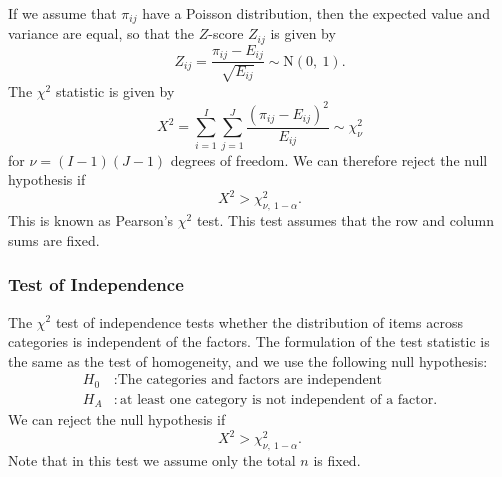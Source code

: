 \documentclass{article}
\begin{document}
If we assume that \(\pi_{ij}\) have a Poisson distribution, then the expected value and variance are equal, so that
the \(Z\)-score \(Z_{ij}\) is given by
\begin{equation*}
    Z_{ij} = \frac{\pi_{ij} - E_{ij}}{\sqrt{E_{ij}}} \sim \mathrm{N}\left( 0,\: 1 \right).
\end{equation*}
The \(\chi^2\) statistic is given by
\begin{equation*}
    X^2 = \sum_{i = 1}^I \sum_{j = 1}^J \frac{\left( \pi_{ij} - E_{ij} \right)^2}{E_{ij}} \sim \chi_{\nu}^2
\end{equation*}
for \(\nu = \left( I - 1 \right)\left( J - 1 \right)\) degrees of freedom. We can therefore reject the null hypothesis if
\begin{equation*}
    X^2 > \chi_{\nu, \: 1 - \alpha}^2.
\end{equation*}
This is known as Pearson's \(\chi^2\) test. This test assumes that the row and column sums are fixed.
\subsubsection{Test of Independence}
The \(\chi^2\) test of independence tests whether the distribution of
items across categories is independent of the factors. The formulation
of the test statistic is the same as the test of homogeneity, and we
use the following null hypothesis:
\begin{align*}
    H_0 & : \text{The categories and factors are independent}            \\
    H_A & : \text{at least one category is not independent of a factor}.
\end{align*}
We can reject the null hypothesis if
\begin{equation*}
    X^2 > \chi_{\nu, \: 1 - \alpha}^2.
\end{equation*}
Note that in this test we assume only the total \(n\) is fixed.
\end{document}

